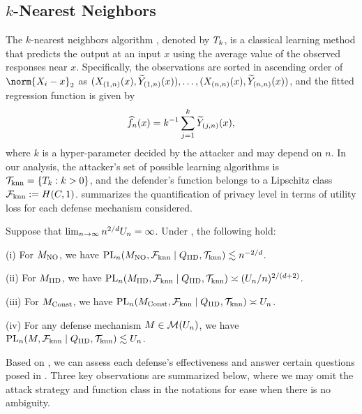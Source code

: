     \subsection{\texorpdfstring{$k$}{k}-Nearest Neighbors}
        The $k$-nearest neighbors algorithm \citep[see, e.g., ][]{gyorfi2002distribution}, denoted by $T_k$, is a classical learning method that predicts the output at an input $x$ using the average value of the observed responses near $x$. Specifically, the observations are sorted in ascending order of $\norm{\X_i- x}_2$ as $(X_{(1,n)}(x), \widetilde{Y}_{(1,n)}(x)), \ldots, (X_{(n,n)}(x), \widetilde{Y}_{(n,n)}(x))$, and
        the fitted regression function is given by
        \begin{align}\label{eq:knn}
            \widehat{f}_n(x) = k^{-1} \sum_{j=1}^k \widetilde{Y}_{(j,n)}(x),
        \end{align}
        where $k$ is a hyper-parameter decided by the attacker and may depend on $n$.
        In our analysis, the attacker's set of possible learning algorithms is $\mathcal{T}_{\textrm{knn}} = \{T_k: k>0 \}$, and the defender's function belongs to a Lipschitz class $\mathcal{F}_{\textrm{knn}}:= H(C,1)$.
         summarizes the quantification of privacy level in terms of utility loss for each defense mechanism considered.
        
        \begin{theorem}\label{thm:knn}
           Suppose that $\lim_{n\to\infty} n^{2/d}U_n =\infty $.
           Under , the following hold:
           
                (i) For $M_{\textrm{NO}}$, we have $\textrm{PL}_n(M_{\textrm{NO}},\mathcal{F}_{\textrm{knn}}\mid Q_{\textrm{IID}}, \mathcal{T}_{\textrm{knn}} ) \lesssim n^{-2/d}$.
                
                (ii) For $M_{\textrm{IID}}$, we have $\textrm{PL}_n(M_{\textrm{IID}},\mathcal{F}_{\textrm{knn}}\mid Q_{\textrm{IID}}, \mathcal{T}_{\textrm{knn}}) \asymp (U_n/n)^{2/(d+2)}$.
               
                (iii) For $M_{\textrm{Const}}$, we have $\textrm{PL}_n(M_{\textrm{Const}},\mathcal{F}_{\textrm{knn}}\mid Q_{\textrm{IID}}, \mathcal{T}_{\textrm{knn}}) \asymp U_n$.
      
                (iv) For any defense mechanism $M \in \mathcal{M}(U_n)$,
                we have $\textrm{PL}_n(M,\mathcal{F}_{\textrm{knn}}\mid Q_{\textrm{IID}}, \mathcal{T}_{\textrm{knn}}) \lesssim U_n$.
        \end{theorem}
        Based on , we can assess each defense's effectiveness and answer certain questions posed in . Three key observations are summarized below, where we may omit the attack strategy and function class in the notations for ease when there is no ambiguity.
        
